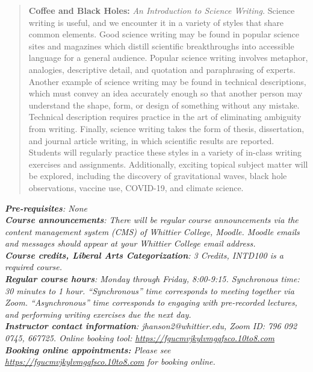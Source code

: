 \documentclass[10pt]{article}
\begin{document}
\maketitle

\begin{abstract}
\textbf{Coffee and Black Holes:} \textit{An Introduction to Science Writing.}  Science writing is useful, and we encounter it in a variety of styles that share common elements. Good science writing may be found in popular science sites and magazines which distill scientific breakthroughs into accessible language for a general audience. Popular science writing involves metaphor, analogies, descriptive detail, and quotation and paraphrasing of experts. Another example of science writing may be found in technical descriptions, which must convey an idea accurately enough so that another person may understand the shape, form, or design of something without any mistake. Technical description requires practice in the art of eliminating ambiguity from writing. Finally, science writing takes the form of thesis, dissertation, and journal article writing, in which scientific results are reported. Students will regularly practice these styles in a variety of in-class writing exercises and assignments.  Additionally, exciting topical subject matter will be explored, including the discovery of gravitational waves, black hole observations, vaccine use, COVID-19, and climate science.
\end{abstract}
\noindent
\textit{\textbf{Pre-requisites}: None} \\
\textit{\textbf{Course announcements}: There will be regular course announcements via the content management system (CMS) of Whittier College, Moodle.  Moodle emails and messages should appear at your Whittier College email address.} \\
\textit{\textbf{Course credits, Liberal Arts Categorization}: 3 Credits, INTD100 is a required course.} \\
\textit{\textbf{Regular course hours}: Monday through Friday, 8:00-9:15.  Synchronous time: 30 minutes to 1 hour.  ``Synchronous'' time corresponds to meeting together via Zoom. ``Asynchronous'' time corresponds to engaging with pre-recorded lectures, and performing writing exercises due the next day.} \\
\textit{\textbf{Instructor contact information}: jhanson2@whittier.edu, Zoom ID: 796 092 0745, 667725.  Online booking tool: \url{https://fgucmvjkylvmgqfsco.10to8.com}} \\
\textit{\textbf{Booking online appointments:} Please see \url{https://fgucmvjkylvmgqfsco.10to8.com} for booking online.} \\
\end{document}
